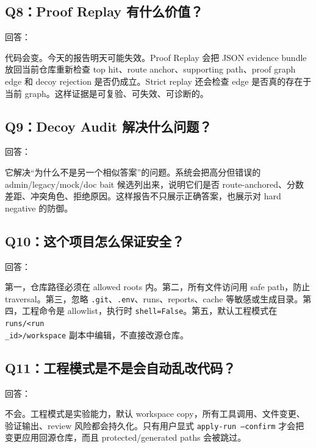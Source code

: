 \documentclass[UTF8,12pt,openany]{ctexbook}
\begin{document}
\subsection{Q8：Proof Replay 有什么价值？}

回答：\par

代码会变。今天的报告明天可能失效。Proof Replay 会把 JSON evidence bundle 放回当前仓库重新检查 top hit、route anchor、supporting path、proof graph edge 和 decoy rejection 是否仍成立。Strict replay 还会检查 edge 是否真的存在于当前 graph。这样证据是可复验、可失效、可诊断的。\par

\subsection{Q9：Decoy Audit 解决什么问题？}

回答：\par

它解决“为什么不是另一个相似答案”的问题。系统会把高分但错误的 admin/legacy/mock/doc bait 候选列出来，说明它们是否 route-anchored、分数差距、冲突角色、拒绝原因。这样报告不只展示正确答案，也展示对 hard negative 的防御。\par

\subsection{Q10：这个项目怎么保证安全？}

回答：\par

第一，仓库路径必须在 allowed roots 内。第二，所有文件访问用 safe path，防止 traversal。第三，忽略 \texttt{.git}、\texttt{.env}、runs、reports、cache 等敏感或生成目录。第四，工程命令是 allowlist，执行时 \texttt{shell=False}。第五，默认工程模式在 \texttt{runs/<run\\_id>/workspace} 副本中编辑，不直接改源仓库。\par

\subsection{Q11：工程模式是不是会自动乱改代码？}

回答：\par

不会。工程模式是实验能力，默认 workspace copy，所有工具调用、文件变更、验证输出、review 风险都会持久化。只有用户显式 \texttt{apply-run --confirm} 才会把变更应用回源仓库，而且 protected/generated paths 会被跳过。\par
\end{document}

